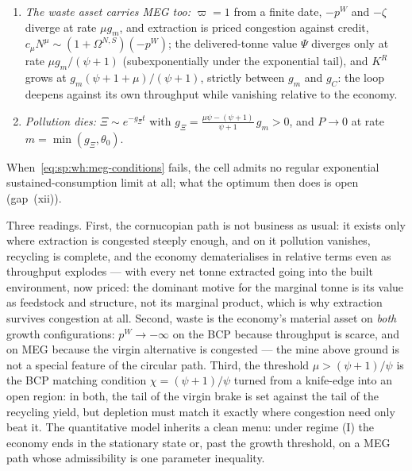 \begin{proposition}
\begin{enumerate}
    so $g_S=g_m/\left(1+\chi\right)$ and the reserve-to-extraction ratio falls.
    \item \emph{The waste asset carries MEG too:} $\varpi=1$ from a finite date, $-p^W$ and
    $-\zeta$ diverge at rate $\mu g_m$, and extraction is priced congestion against credit,
    $c_\mu N^\mu\sim\left(1+\Omega^{N,S}\right)\left(-p^W\right)$; the delivered-tonne value
    $\Psi$ diverges only at rate $\mu g_m/\left(\psi+1\right)$ (subexponentially under the
    exponential tail), and $K^R$ grows at $g_m\left(\psi+1+\mu\right)/\left(\psi+1\right)$,
    strictly between $g_m$ and $g_C$: the loop deepens against its own throughput while
    vanishing relative to the economy.
    \item \emph{Pollution dies:} $\Xi\sim e^{-g_\Xi t}$ with
    $g_\Xi=\frac{\mu\psi-\left(\psi+1\right)}{\psi+1}\,g_m>0$, and $P\to0$ at rate
    $m=\min\left(g_\Xi,\theta_0\right)$.
\end{enumerate}
When~\eqref{eq:sp:wh:meg-conditions} fails, the cell admits no regular exponential
sustained-consumption limit at all; what the optimum then does is open (gap~(xii)).
\end{proposition}

Three readings. First, the cornucopian path is not business as usual: it exists only where
extraction is congested steeply enough, and on it pollution vanishes, recycling is complete,
and the economy dematerialises in relative terms even as throughput explodes --- with every
net tonne extracted going into the built environment, now priced: the dominant motive for the
marginal tonne is its value as feedstock and structure, not its marginal product, which is why
extraction survives congestion at all. Second, waste is the economy's material asset on
\emph{both} growth configurations: $p^W\to-\infty$ on the BCP because throughput is scarce,
and on MEG because the virgin alternative is congested --- the mine above ground is not a
special feature of the circular path. Third, the threshold
$\mu>\left(\psi+1\right)/\psi$ is the BCP matching condition $\chi=\left(\psi+1\right)/\psi$
turned from a knife-edge into an open region: in both, the tail of the virgin brake is set
against the tail of the recycling yield, but depletion must match it exactly where congestion
need only beat it. The quantitative model inherits a clean menu: under regime (I) the economy
ends in the stationary state or, past the growth threshold, on a MEG path whose admissibility
is one parameter inequality.

